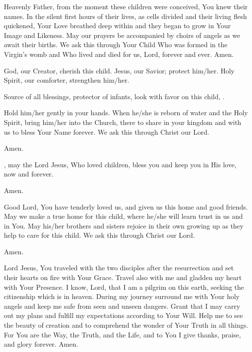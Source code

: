 \label{prayer:babies_about_to_be_born}
Heavenly Father, from the moment these children were conceived, You knew their names.
In the silent first hours of their lives, as cells divided and their living flesh quickened, Your Love breathed deep within and they began to grow in Your Image and Likeness.
May our prayers be accompanied by choirs of angels as we await their births.
We ask this through Your Child Who was formed in the Virgin's womb and Who lived and died for us, Lord, forever and ever. Amen.

\label{prayer:thanksgiving_newborn}
God, our Creator, cherish this child.
Jesus, our Savior; protect him/her.
Holy Spirit, our comforter, strengthen him/her.

Source of all blessings, protector of infants, look with favor on this child, \insertname.

Hold him/her gently in your hands.
When he/she is reborn of water and the Holy Spirit, bring him/her into the Church, there to share in your kingdom and with us to bless Your Name forever.
We ask this through Christ our Lord.

\response Amen.


\insertname, may the Lord Jesus, Who loved children, bless you and keep you in His love, now and forever.

\response Amen.

\label{prayer:bringing_child_into_home}
Good Lord, You have tenderly loved us, and given us this home and good friends.
May we make a true home for this child, where he/she will learn trust in us and in You.
May his/her brothers and sisters rejoice in their own growing up as they help to care for this child.
We ask this through Christ our Lord.

\response Amen.

Lord Jesus, You traveled with the two disciples after the resurrection and set their hearts on fire with Your Grace.
Travel also with me and gladden my heart with Your Presence.
I know, Lord, that I am a pilgrim on this earth, seeking the citizenship which is in heaven.
During my journey surround me with Your holy angels and keep me safe from seen and unseen dangers.
Grant that I may carry out my plans and fulfill my expectations according to Your Will.
Help me to see the beauty of creation and to comprehend the wonder of Your Truth in all things.
For You are the Way, the Truth, and the Life, and to You I give thanks, praise, and glory forever.
Amen.

